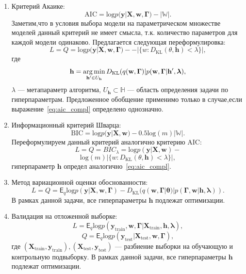 \begin{enumerate}
\item Критерий Акаике:
\[
   \text{AIC} =  \text{log}p(\mathbf{y}|\mathbf{X}, \mathbf{w}, \boldsymbol{\Gamma})-|\mathbb{W}|.
\]
Заметим,что в условия выбора модели на параметрическом множестве моделей данный критерий не имеет смысла, т.к. количество параметров для каждой модели одинаково. Предлагается следующая переформулировка:
\begin{equation}
\label{eq:optim_aic}
    L = Q = \text{log}p(\mathbf{y}|\mathbf{X}, \mathbf{w}, \boldsymbol{\Gamma})-
-|\{w: D_\text{KL}(\theta, \mathbf{h})<\lambda\}|,
\end{equation}
где 
\begin{equation}\label{eq:aic_compl}\mathbf{h}=\operatorname*{arg\,min}_{\mathbf{h}'\in U_\mathbf{h}}D_\text{KL}(q(\mathbf{w},\boldsymbol{\Gamma})| p(\mathbf{w},\boldsymbol{\Gamma}|\mathbf{h}',\boldsymbol{\lambda}),\end{equation} $\lambda$ --- метапараметр алгоритма, $U_\mathbf{h}  \subset \mathbb{H}$ --- область определения задачи по гиперпараметрам. Предложенное обобщение применимо только в случае,если выражение~\eqref{eq:aic_compl} определено однозначно.

\item Информационный критерий Шварца:
\[
    \text{BIC} = \text{log}p(\mathbf{y}|\mathbf{X}, \mathbf{w})-0.5\text{log}(m)|\mathbb{W}|.
\]
Переформулируем данный критерий аналогично критерию AIC:
\begin{equation}
\label{eq:optim_bic}
    L = Q = BIC_{\lambda} = \text{log}p(\mathbf{y}|\mathbf{X}, \mathbf{w}) -
\end{equation}
\[
 \text{log}(m)|\{w: D_\text{KL}(\theta, \mathbf{h})<\lambda\}|,
\]
гиперпараметр $\mathbf{h}$ определ аналогично~\eqref{eq:aic_compl}.

\item Метод вариационной оценки обоснованности:
\begin{equation}
\label{eq:optim_elbo_method}   
    L = Q = \mathsf{E}_q \text{log}p(\mathbf{y}|\mathbf{X}, \mathbf{w}, \boldsymbol{\Gamma})-D_\text{KL}(q(\mathbf{w}, \boldsymbol{\Gamma}|\boldsymbol{\theta})|p(\boldsymbol{\Gamma}, \mathbf{w}|\mathbf{h},\boldsymbol{\lambda})).
\end{equation}
В рамках данной задачи, все гиперпараметры $\mathbf{h}$ подлежат оптимизации.

\item Валидация на отложенной выборке:
\begin{equation}
\label{eq:optim_hold_out}
    L = \mathsf{E}_q \text{log}p(\mathbf{y}_\text{train}, \mathbf{w}, \boldsymbol{\Gamma}|\mathbf{X}_\text{train}, \mathbf{h}, \boldsymbol{\lambda}),
\end{equation}
\[
    Q = \mathsf{E}_q \text{log}p(\mathbf{y}_\text{test}|\mathbf{X}_\text{test}, \mathbf{w}, \boldsymbol{\Gamma}),
\]
где $(\mathbf{X}_\text{train}, \mathbf{y}_\text{train}), (\mathbf{X}_\text{test}, \mathbf{y}_\text{test})$ --- разбиение выборки на обучающую и контрольную подвыборку.
В рамках данной задачи, все гиперпараметры $\mathbf{h}$ подлежат оптимизации.

\end{enumerate}

